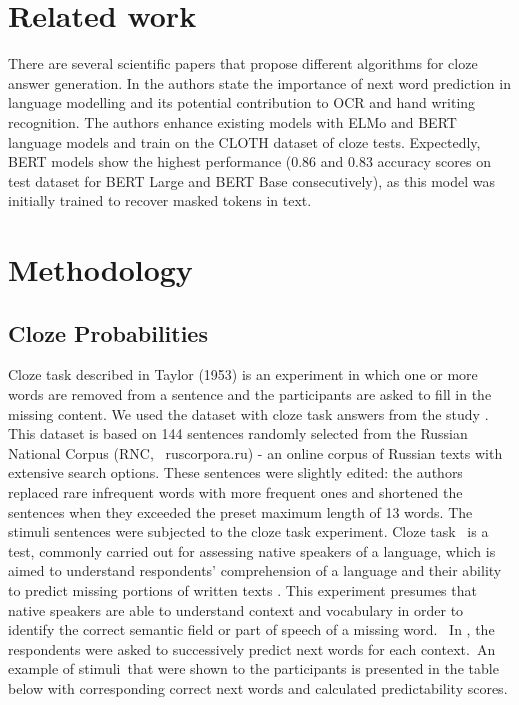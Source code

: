 \documentclass[a4paper]{article}
\begin{document}
\section{Related work}

There are several scientific papers that propose different algorithms for cloze answer generation. In \cite{zhou-cloze} the authors state the importance of next word prediction in language modelling and its potential contribution to OCR and hand writing recognition. The authors enhance existing models with ELMo and BERT language models and train on the CLOTH dataset of cloze tests. Expectedly, BERT models show the highest performance (0.86 and 0.83 accuracy scores on test dataset for BERT Large and BERT Base consecutively), as this model was initially trained to recover masked tokens in text.

\section{Methodology}

\subsection{Cloze Probabilities}

Cloze task described in Taylor (1953) is an experiment in which one or more words are removed from a sentence and the participants are asked to fill in the missing content. 
We used the dataset with cloze task answers from the study
\cite{laurinavichyute}. This dataset is based on 144 sentences
randomly selected from the Russian National Corpus (RNC,
 ruscorpora.ru) - an online corpus of Russian texts with extensive
search options. These sentences were slightly edited: the authors
replaced rare infrequent words with more frequent ones and shortened
the sentences when they exceeded the preset maximum length of 13
words. The stimuli sentences were subjected to the cloze task
experiment. Cloze task \cite{taylor:1953} is a test, commonly carried out
for assessing native speakers of a language, which is aimed to
understand respondents’ comprehension of a language and their ability
to predict missing portions of written texts \cite{laurinavichyute}. This experiment presumes that native speakers are able to understand context and vocabulary in order to identify the correct semantic field or part of speech of a missing word.
 In \cite{laurinavichyute}, the respondents were asked to successively predict next words for each context. An example of stimuli that were shown to the participants is presented in the table below with corresponding correct next words and calculated predictability scores.
\end{document}
